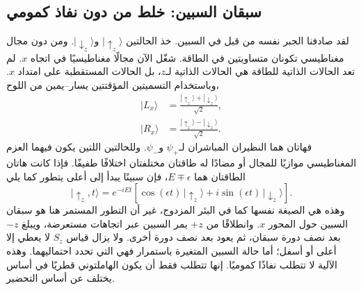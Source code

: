 \subsection{سبقان السبين: خلط من دون نفاذ كمومي}

لقد صادفنا الجبر نفسه من قبل في السبين. خذ الحالتين \(|\uparrow_z\rangle\) و\(|\downarrow_z\rangle\). ومن دون مجال مغناطيسي تكونان متساويتين في الطاقة. شغّل الآن مجالًا مغناطيسيًا في اتجاه \(x\). لم تعد الحالات الذاتية للطاقة هي الحالات الذاتية لـ\(z\)، بل الحالات المستقطبة على امتداد \(x\). وباستخدام التسميتين المؤقتتين يسار--يمين من اللوح،
\begin{align}
|L_x\rangle &= \frac{|\uparrow_z\rangle+|\downarrow_z\rangle}{\sqrt{2}},\\
|R_x\rangle &= \frac{|\uparrow_z\rangle-|\downarrow_z\rangle}{\sqrt{2}}.
\end{align}
فهاتان هما النظيران المباشران لـ\(\psi_+\) و\(\psi_-\). وللحالتين اللتين يكون فيهما العزم المغناطيسي موازيًا للمجال أو مضادًا له طاقتان مختلفتان اختلافًا طفيفًا. فإذا كانت هاتان الطاقتان هما \(E\mp\epsilon\)، فإن سبينًا يبدأ إلى أعلى يتطور كما يلي
\begin{equation}
|\uparrow_z,t\rangle
= e^{-iEt}\left[\cos(\epsilon t)\,|\uparrow_z\rangle
+ i\sin(\epsilon t)\,|\downarrow_z\rangle\right].
\end{equation}
وهذه هي الصيغة نفسها كما في البئر المزدوج، غير أن التطور المستمر هنا هو سبقان السبين حول المحور \(x\). وانطلاقًا من \(+z\) يمر السبين عبر اتجاهات مستعرضة، ويبلغ \(-z\) بعد نصف دورة سبقان، ثم يعود بعد نصف دورة أخرى. ولا يزال قياس \(S_z\) لا يعطي إلا أعلى أو أسفل؛ أما حالة السبين المتغيرة باستمرار فهي التي تحدد احتماليهما. وهذه الآلية لا تتطلب نفاذًا كموميًا. إنها تتطلب فقط أن يكون الهاملتوني قطريًا في أساس يختلف عن أساس التحضير.

\begin{classroomqa}
\end{classroomqa}

\begin{classroomqa}
\end{classroomqa}

